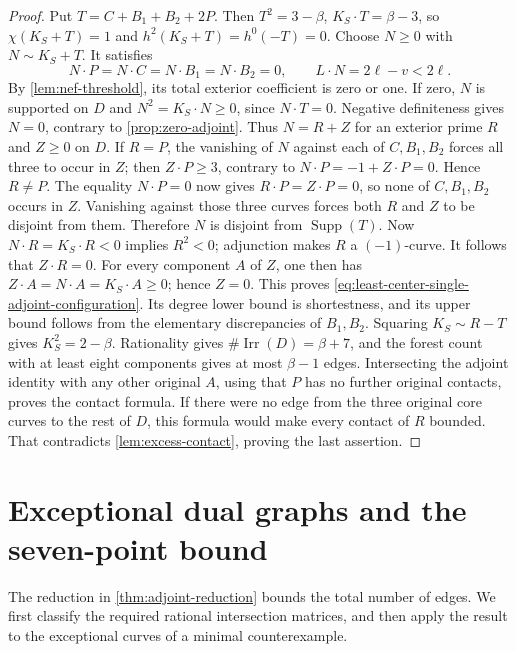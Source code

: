 \documentclass[11pt,reqno]{amsart}
\theoremstyle{definition}
\theoremstyle{remark}
\DeclareMathOperator{\Irr}{Irr}
\numberwithin{equation}{section}
\begin{document}
\begin{proof}
Put $T=C+B_1+B_2+2P$.
Then $T^2=3-\beta$, $K_S\cdot T=\beta-3$, so
$\chi(K_S+T)=1$ and $h^2(K_S+T)=h^0(-T)=0$.
Choose $N\ge0$ with $N\sim K_S+T$.
It satisfies
\[
 N\cdot P=N\cdot C=N\cdot B_1=N\cdot B_2=0,
 \qquad L\cdot N=2\ell-v<2\ell.
\]
By \cref{lem:nef-threshold}, its total exterior coefficient
is zero or one. If zero, $N$ is supported on $D$ and
$N^2=K_S\cdot N\ge0$, since $N\cdot T=0$.
Negative definiteness gives $N=0$, contrary to
\cref{prop:zero-adjoint}.
Thus $N=R+Z$ for an exterior prime $R$ and $Z\ge0$ on $D$.
If $R=P$, the vanishing of $N$ against each of $C,B_1,B_2$
forces all three to occur in $Z$; then $Z\cdot P\ge3$, contrary
to $N\cdot P=-1+Z\cdot P=0$.
Hence $R\ne P$. The equality $N\cdot P=0$ now gives
$R\cdot P=Z\cdot P=0$, so none of $C,B_1,B_2$ occurs in $Z$.
Vanishing against those three curves forces both $R$ and $Z$ to be
disjoint from them. Therefore $N$ is disjoint from $\operatorname{Supp}(T)$.
Now $N\cdot R=K_S\cdot R<0$ implies $R^2<0$; adjunction makes
$R$ a $(-1)$-curve. It follows that $Z\cdot R=0$.
For every component $A$ of $Z$, one then has
$Z\cdot A=N\cdot A=K_S\cdot A\ge0$; hence $Z=0$.
This proves \eqref{eq:least-center-single-adjoint-configuration}.
Its degree lower bound is shortestness, and its upper bound follows
from the elementary discrepancies of $B_1,B_2$.
Squaring $K_S\sim R-T$ gives $K_S^2=2-\beta$.
Rationality gives $\#\Irr(D)=\beta+7$, and the forest count with
at least eight components gives at most $\beta-1$ edges.
Intersecting the adjoint identity with any other original $A$, using that
$P$ has no further original contacts, proves the contact formula.
If there were no edge from the three original core curves to the rest of
$D$, this formula would make every contact of $R$ bounded.
That contradicts \cref{lem:excess-contact}, proving the last assertion.
\end{proof}

\section{Exceptional dual graphs and the seven-point bound}
\label{sec:classification}
The reduction in \cref{thm:adjoint-reduction} bounds
the total number of edges. We first classify the required rational
intersection matrices, and then apply the result to the exceptional
curves of a minimal counterexample.

\end{document}
